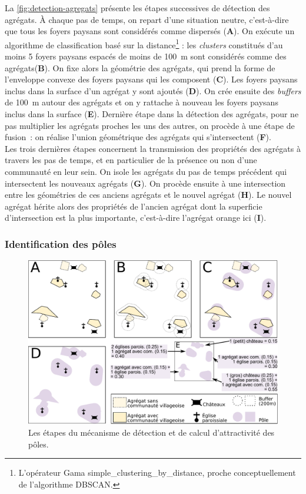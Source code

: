 La \cref{fig:detection-agregats} présente les étapes successives de détection des agrégats.
À chaque pas de temps, on repart d'une situation \og neutre\fg{}, c'est-à-dire que tous les foyers paysans sont considérés comme dispersés (\textbf{A}).
On exécute un algorithme de classification basé sur la distance\footnote{
	L'opérateur Gama \textsf{simple\_clustering\_by\_distance}, proche conceptuellement de l'algorithme DBSCAN.
} : les \textit{clusters} constitués d'au moins 5 foyers paysans espacés de moins de 100~m sont considérés comme des agrégats(\textbf{B}).
On fixe alors la géométrie des agrégats, qui prend la forme de l'enveloppe convexe des foyers paysans qui les composent (\textbf{C}).
Les foyers paysans inclus dans la surface d'un agrégat y sont ajoutés (\textbf{D}).
On crée ensuite des \textit{buffers} de 100~m autour des agrégats et on y rattache à nouveau les foyers paysans inclus dans la surface (\textbf{E}).
Dernière étape dans la détection des agrégats, pour ne pas multiplier les agrégats proches les uns des autres, on procède à une étape de fusion : on réalise l'union géométrique des agrégats qui s'intersectent (\textbf{F}).\\
Les trois dernières étapes concernent la transmission des propriétés des agrégats à travers les pas de temps, et en particulier de la présence ou non d'une communauté en leur sein.
On isole les agrégats du pas de temps précédent qui intersectent les nouveaux agrégats (\textbf{G}).
On procède ensuite à une intersection entre les géométries de ces anciens agrégats et le nouvel agrégat (\textbf{H}).
Le nouvel agrégat hérite alors des propriétés de l'ancien agrégat dont la superficie d'intersection est la plus importante, c'est-à-dire l'agrégat orange ici (\textbf{I}).
	
	\subsubsection{Identification des pôles \label{sssec:poles}}

\begin{figure}[H]
	\centering
	\includegraphics[width=\linewidth]{img/detection_poles.pdf}
	\caption{Les étapes du mécanisme de détection et de calcul d'attractivité des pôles.}
	\label{fig:detection-poles}
\end{figure}

